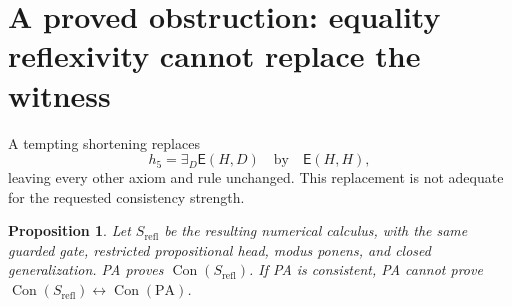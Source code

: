 \documentclass[11pt,a4paper]{article}
\newcommand{\PA}{\mathrm{PA}}
\newcommand{\Con}{\operatorname{Con}}
\newcommand{\EE}{\mathsf{E}}
\newtheorem{proposition}{Proposition}
\begin{document}
\section{A proved obstruction: equality reflexivity cannot replace the witness}

A tempting shortening replaces
\[
h_5=\exists_D\EE(H,D)
\quad\text{by}\quad
\EE(H,H),
\]
leaving every other axiom and rule unchanged. This replacement is not adequate for the requested consistency strength.

\begin{proposition}
Let $S_{\mathrm{refl}}$ be the resulting numerical calculus, with the same guarded gate, restricted propositional head, modus ponens, and closed generalization. PA proves $\Con(S_{\mathrm{refl}})$. If PA is consistent, PA cannot prove
$\Con(S_{\mathrm{refl}})\leftrightarrow\Con(\PA)$.
\end{proposition}
\end{document}
